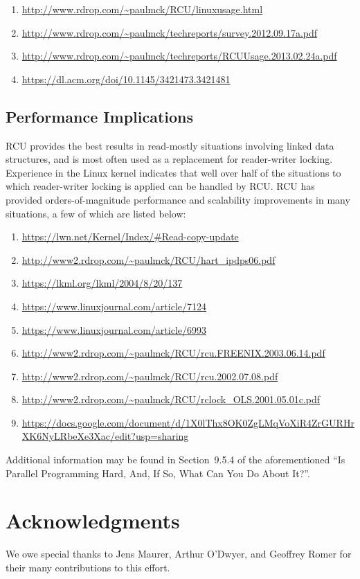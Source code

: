 \begin{enumerate}
\item	\url{http://www.rdrop.com/~paulmck/RCU/linuxusage.html}
\item	\url{http://www.rdrop.com/~paulmck/techreports/survey.2012.09.17a.pdf}
\item	\url{http://www.rdrop.com/~paulmck/techreports/RCUUsage.2013.02.24a.pdf}
\item	\url{https://dl.acm.org/doi/10.1145/3421473.3421481}
\end{enumerate}

\subsection{Performance Implications}
\label{sec:Performance Implications}

RCU provides the best results in read-mostly situations involving linked
data structures, and is most often used as a replacement for reader-writer
locking.
Experience in the Linux kernel indicates that well over half of the
situations to which reader-writer locking is applied can be handled
by RCU.
RCU has provided orders-of-magnitude performance and scalability
improvements in many situations, a few of which are listed below:

\begin{enumerate}
\item	\url{https://lwn.net/Kernel/Index/#Read-copy-update}
\item	\url{http://www2.rdrop.com/~paulmck/RCU/hart_ipdps06.pdf}
\item	\url{https://lkml.org/lkml/2004/8/20/137}
\item	\url{https://www.linuxjournal.com/article/7124}
\item	\url{https://www.linuxjournal.com/article/6993}
\item	\url{http://www2.rdrop.com/~paulmck/RCU/rcu.FREENIX.2003.06.14.pdf}
\item	\url{http://www2.rdrop.com/~paulmck/RCU/rcu.2002.07.08.pdf}
\item	\url{http://www2.rdrop.com/~paulmck/RCU/rclock_OLS.2001.05.01c.pdf}
\item	\url{https://docs.google.com/document/d/1X0lThx8OK0ZgLMqVoXiR4ZrGURHrXK6NyLRbeXe3Xac/edit?usp=sharing}
\end{enumerate}

Additional information may be found in Section~9.5.4 of the aforementioned
``Is Parallel Programming Hard, And, If So, What Can You Do About It?''.

\section{Acknowledgments}
\label{sec:Acknowledgments}

We owe special thanks to Jens Maurer, Arthur O'Dwyer, and Geoffrey Romer
for their many contributions to this effort.
